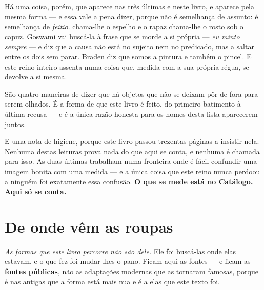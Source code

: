 \documentclass[livro.tex]{subfiles}
\begin{document}
\noindent Há uma coisa, porém, que aparece nas três últimas e neste livro, e aparece pela mesma
forma --- e essa vale a pena dizer, porque não é semelhança de assunto: é semelhança de
\emph{feitio}. \Drk chama-lhe o espelho e o rapaz chama-lhe o rosto sob o capuz. Goswami vai
buscá-la à frase que se morde a si própria --- \emph{eu minto sempre} --- e diz que a causa não
está no sujeito nem no predicado, mas a saltar entre os dois sem parar. Braden diz que somos a
pintura e também o pincel. E este reino inteiro assenta numa coisa que, medida com a sua própria
régua, se devolve a si mesma.

São quatro maneiras de dizer que há objetos que não se deixam pôr de fora para serem olhados. É a
forma de que este livro é feito, do primeiro batimento à última recusa --- e é a única razão
honesta para os nomes desta lista aparecerem juntos.

\medskip
\noindent E uma nota de higiene, porque este livro passou trezentas páginas a insistir nela.
Nenhuma destas leituras prova nada do que aqui se conta, e nenhuma é chamada para isso. As duas
últimas trabalham numa fronteira onde é fácil confundir uma imagem bonita com uma medida --- e a
única coisa que este reino nunca perdoou a ninguém foi exatamente essa confusão. \textbf{O que se
mede está no Catálogo. Aqui só se conta.}


\chapter*{De onde vêm as roupas}

\noindent \emph{As formas que este livro percorre não são dele.} Ele foi buscá-las onde elas
estavam, e o que fez foi mudar-lhes o pano. Ficam aqui as fontes --- e ficam as \textbf{fontes
públicas}, não as adaptações modernas que as tornaram famosas, porque é nas antigas que a forma
está mais nua e é a elas que este texto foi.
\end{document}
